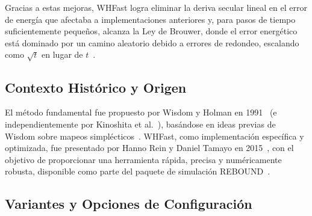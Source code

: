 Gracias a estas mejoras, WHFast logra eliminar la deriva secular lineal en el error de energía que afectaba a implementaciones anteriores y, para pasos de tiempo suficientemente pequeños, alcanza la Ley de Brouwer, donde el error energético está dominado por un camino aleatorio debido a errores de redondeo, escalando como \(\sqrt{t}\) en lugar de \(t\)~\cite{ReinTamayo2015, Rein2012}.

\subsection{Contexto Histórico y Origen}

El método fundamental fue propuesto por Wisdom y Holman en 1991~\cite{wisdom1991} (e independientemente por Kinoshita et al.~\cite{Kinoshita1990}), basándose en ideas previas de Wisdom sobre mapeos simplécticos~\cite{Wisdom1980}. WHFast, como implementación específica y optimizada, fue presentado por Hanno Rein y Daniel Tamayo en 2015~\cite{ReinTamayo2015}, con el objetivo de proporcionar una herramienta rápida, precisa y numéricamente robusta, disponible como parte del paquete de simulación REBOUND~\cite{Rein2012}.

\subsection{Variantes y Opciones de Configuración}

